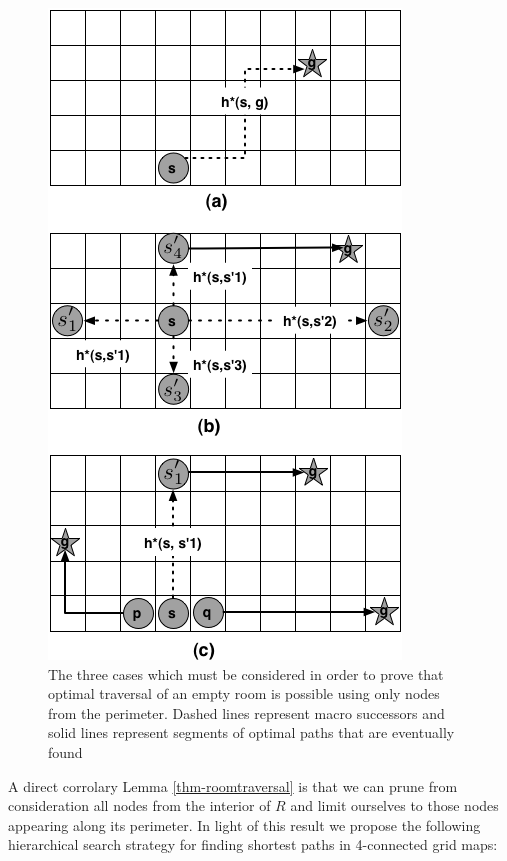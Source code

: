 \begin{figure}[htbp]
	\label{fig-roomtraversal}
	\vspace{-4pt}
       \begin{center}
           \includegraphics[scale=0.50, trim = 10mm 10mm 10mm 0mm]{diagrams/roomtraversal.png}
       \end{center}
	\vspace{-3pt}
       \caption{The three cases which must be considered in order to prove that 
			optimal traversal of an empty room is possible using only nodes from the perimeter.
			Dashed lines represent macro successors and solid lines represent segments of optimal
			paths that are eventually found}
       \label{fig-ohacontrast}
	\vspace{-15pt}
\end{figure}

A direct corrolary Lemma \ref{thm-roomtraversal} is that we can prune from consideration
all nodes from the interior of $R$ and limit ourselves to those nodes appearing along its perimeter.
In light of this result we propose the following hierarchical search strategy for finding shortest 
paths in 4-connected grid maps:

